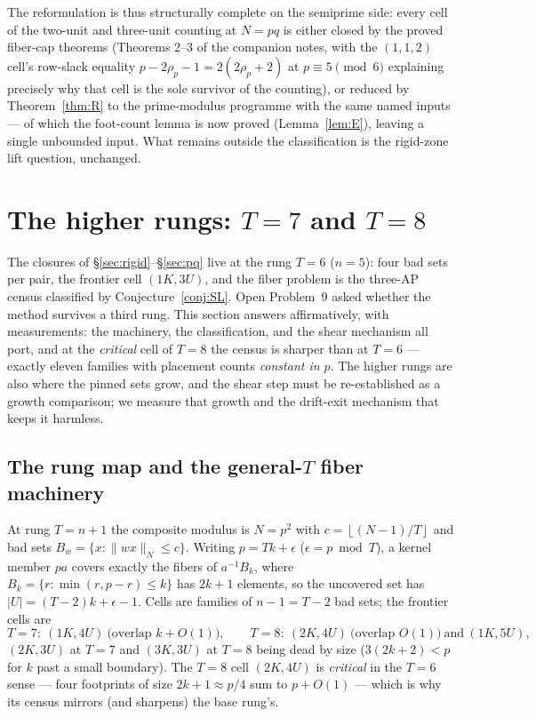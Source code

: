 \documentclass[11pt,a4paper]{article}
\numberwithin{equation}{section}
\theoremstyle{plain}
\theoremstyle{definition}
\theoremstyle{remark}
\newcommand{\floor}[1]{\left\lfloor #1 \right\rfloor}
\newcommand{\wn}[1]{\lVert #1 \rVert_{N}}
\begin{document}
The reformulation is thus structurally complete on the semiprime side: every
cell of the two-unit and three-unit counting at $N=pq$ is either closed by
the proved fiber-cap theorems (Theorems 2--3 of the companion notes, with the
$(1,1,2)$ cell's row-slack equality $p-2\rho_p-1=2(2\rho_p+2)$ at
$p\equiv5\pmod6$ explaining precisely why that cell is the sole survivor of
the counting), or reduced by Theorem~\ref{thm:R} to the prime-modulus
programme with the same named inputs --- of which the foot-count lemma is
now proved (Lemma~\ref{lem:E}), leaving a single unbounded input. What
remains outside the
classification is the rigid-zone lift question, unchanged.


\section{The higher rungs: $T=7$ and $T=8$}\label{sec:higherrung}

The closures of \S\ref{sec:rigid}--\S\ref{sec:pq} live at the rung $T=6$
($n=5$): four bad sets per pair, the frontier cell $(1K,3U)$, and the
fiber problem is the three-AP census classified by Conjecture~\ref{conj:SL}.
Open Problem~9 asked whether the method survives a third rung. This
section answers affirmatively, with measurements: the machinery, the
classification, and the shear mechanism all port, and at the \emph{critical}
cell of $T=8$ the census is sharper than at $T=6$ --- exactly eleven
families with placement counts \emph{constant in $p$}. The higher rungs
are also where the pinned sets grow, and the shear step must be
re-established as a growth comparison; we measure that growth and the
drift-exit mechanism that keeps it harmless.

\subsection{The rung map and the general-\texorpdfstring{$T$}{T} fiber machinery}

At rung $T=n+1$ the composite modulus is $N=p^2$ with $c=\floor{(N-1)/T}$
and bad sets $B_w=\{x:\wn{wx}\le c\}$. Writing $p=Tk+\epsilon$
($\epsilon=p\bmod T$), a kernel member $pa$ covers exactly the fibers of
$a^{-1}B_k$, where $B_k=\{r:\min(r,p-r)\le k\}$ has $2k+1$ elements, so
the uncovered set has $|U|=(T-2)k+\epsilon-1$. Cells are families of
$n-1=T-2$ bad sets; the frontier cells are
\[
T=7:\ (1K,4U)\ \text{(overlap }k+O(1)\text{)},\qquad
T=8:\ (2K,4U)\ \text{(overlap }O(1)\text{)}\ \text{and}\ (1K,5U),
\]
$(2K,3U)$ at $T=7$ and $(3K,3U)$ at $T=8$ being dead by size
($3(2k+2)<p$ for $k$ past a small boundary). The $T=8$ cell $(2K,4U)$ is
\emph{critical} in the $T=6$ sense --- four footprints of size
$2k+1\approx p/4$ sum to $p+O(1)$ --- which is why its census mirrors
(and sharpens) the base rung's.
\end{document}
